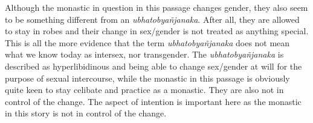 Although the monastic in question in this passage changes gender, they also seem to be something different from an {\em ubhatob­yañ­janaka}. After all, they are allowed to stay in robes and their change in sex/gender is not treated as anything special. This is all the more evidence that the term {\em ubhatob­yañ­janaka} does not mean what we know today as intersex, nor transgender. The {\em ubhatob­yañ­janaka} is described as hyperlibidinous and being able to change sex/gender at will for the purpose of sexual intercourse, while the monastic in this passage is obviously quite keen to stay celibate and practice as a monastic. They are also not in control of the change. The aspect of intention is important here as the monastic in this story is not in control of the change.